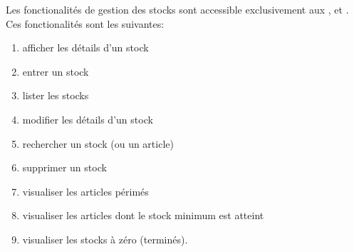 Les fonctionalit\'es de gestion des stocks sont accessible
exclusivement aux \roles \magasinier, \caissier et \manager. Ces
fonctionalit\'es sont les suivantes:
\begin{enumerate}[1)]
	\item afficher les d\'etails d'un stock
	\item entrer un stock 
	\item lister les stocks
	\item modifier les d\'etails d'un stock
	\item rechercher un stock (ou un article)
	\item supprimer un stock
	\item visualiser les articles p\'erim\'es	
	\item visualiser les articles dont le stock minimum est atteint
	\item visualiser les stocks \`a z\'ero (termin\'es).
\end{enumerate}

\label{sec:strategies-gestion-stocks}

